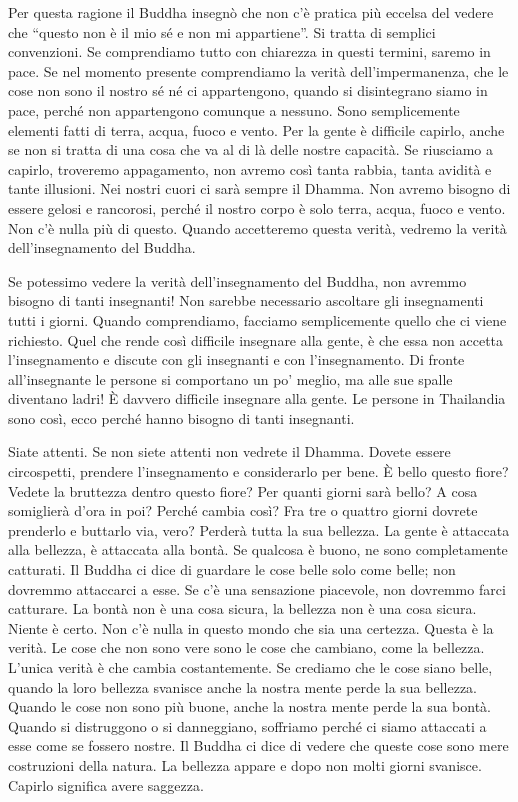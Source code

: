 Per questa ragione il Buddha insegnò che non c'è pratica più eccelsa del
vedere che ``questo non è il mio sé e non mi appartiene''. Si tratta di
semplici convenzioni. Se comprendiamo tutto con chiarezza in questi
termini, saremo in pace. Se nel momento presente comprendiamo la verità
dell'impermanenza, che le cose non sono il nostro sé né ci appartengono,
quando si disintegrano siamo in pace, perché non appartengono comunque a
nessuno. Sono semplicemente elementi fatti di terra, acqua, fuoco e
vento. Per la gente è difficile capirlo, anche se non si tratta di una
cosa che va al di là delle nostre capacità. Se riusciamo a capirlo,
troveremo appagamento, non avremo così tanta rabbia, tanta avidità e
tante illusioni. Nei nostri cuori ci sarà sempre il Dhamma. Non avremo
bisogno di essere gelosi e rancorosi, perché il nostro corpo è solo
terra, acqua, fuoco e vento. Non c'è nulla più di questo. Quando
accetteremo questa verità, vedremo la verità dell'insegnamento del
Buddha.

Se potessimo vedere la verità dell'insegnamento del Buddha, non avremmo
bisogno di tanti insegnanti! Non sarebbe necessario ascoltare gli
insegnamenti tutti i giorni. Quando comprendiamo, facciamo semplicemente
quello che ci viene richiesto. Quel che rende così difficile insegnare
alla gente, è che essa non accetta l'insegnamento e discute con gli
insegnanti e con l'insegnamento. Di fronte all'insegnante le persone si
comportano un po' meglio, ma alle sue spalle diventano ladri! È davvero
difficile insegnare alla gente. Le persone in Thailandia sono così, ecco
perché hanno bisogno di tanti insegnanti.

Siate attenti. Se non siete attenti non vedrete il Dhamma. Dovete essere
circospetti, prendere l'insegnamento e considerarlo per bene. È bello
questo fiore? Vedete la bruttezza dentro questo fiore? Per quanti giorni
sarà bello? A cosa somiglierà d'ora in poi? Perché cambia così? Fra tre
o quattro giorni dovrete prenderlo e buttarlo via, vero? Perderà tutta
la sua bellezza. La gente è attaccata alla bellezza, è attaccata alla
bontà. Se qualcosa è buono, ne sono completamente catturati. Il Buddha
ci dice di guardare le cose belle solo come belle; non dovremmo
attaccarci a esse. Se c'è una sensazione piacevole, non dovremmo farci
catturare. La bontà non è una cosa sicura, la bellezza non è una cosa
sicura. Niente è certo. Non c'è nulla in questo mondo che sia una
certezza. Questa è la verità. Le cose che non sono vere sono le cose che
cambiano, come la bellezza. L'unica verità è che cambia costantemente.
Se crediamo che le cose siano belle, quando la loro bellezza svanisce
anche la nostra mente perde la sua bellezza. Quando le cose non sono più
buone, anche la nostra mente perde la sua bontà. Quando si distruggono o
si danneggiano, soffriamo perché ci siamo attaccati a esse come se
fossero nostre. Il Buddha ci dice di vedere che queste cose sono mere
costruzioni della natura. La bellezza appare e dopo non molti giorni
svanisce. Capirlo significa avere saggezza.

